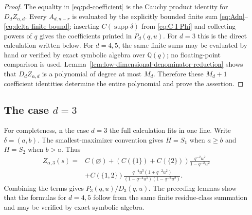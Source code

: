 \documentclass[11pt]{amsart}
\newcommand{\supp}{\operatorname{supp}}
\theoremstyle{plain}
\theoremstyle{definition}
\numberwithin{equation}{section}
\begin{document}
\begin{appendix}
\begin{proof}
The equality in \eqref{eq:pd-coefficient} is the Cauchy product identity for
\(D_dZ_{\alpha,d}\).  Every \(A_{d,n-r}\) is evaluated by the explicitly bounded finite
sum \eqref{eq:Adn}--\eqref{eq:delta-finite-bound}; inserting \(C(\supp\delta)\) from
\eqref{eq:C-I-Phi} and collecting powers of \(q\) gives the coefficients printed in
\(P_d(q,u)\). For \(d=3\) this is the direct calculation written below.  For
\(d=4,5\), the same finite sums may be evaluated by hand or verified by exact symbolic
algebra over \(\mathbb Q(q)\); no floating-point comparison is used.
Lemma~\ref{lem:low-dimensional-denominator-reduction} shows that \(D_dZ_{\alpha,d}\) is
a polynomial of degree at most \(M_d\).  Therefore these \(M_d+1\) coefficient identities
determine the entire polynomial and prove the assertion.
\end{proof}

\subsection{The case \(d=3\)}

For completeness, n the case \(d=3\) the full calculation fits in one line.  Write
\(\delta=(a,b)\).  The smallest-maximizer convention gives \(H=S_1\) when \(a\ge b\)
and \(H=S_2\) when \(b>a\).  Thus
\begin{align}\label{eq:appendix-d3-decomposition}
  Z_{\alpha,3}(s)={}&C(\varnothing)
  +(C(\{1\})+C(\{2\}))\frac{q^{-2}u^2}{1-q^{-2}u^2}
\nonumber\\
  &+C(\{1,2\})
  \frac{q^{-4}u^3(1+q^{-2}u^2)}
  {(1-q^{-4}u^3)(1-q^{-2}u^2)}.
\end{align}
Combining the terms gives \(P_3(q,u)/D_3(q,u)\).  The preceding lemmas show that the
formulas for \(d=4,5\) follow from the same finite residue-class summation and may be
verified by exact symbolic algebra.

\endgroup
\end{appendix}
\end{document}
